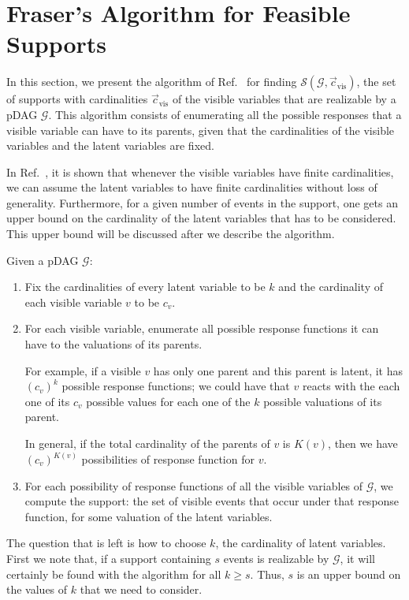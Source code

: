 \section{Fraser's Algorithm for Feasible Supports}
\label{appendix_supports}

In this section, we present the algorithm of Ref.~\cite{Fraser_Combinatorial_Solution} for finding $\mathcal{S}(\mathcal{G},\vec c_\text{vis})$, the set of supports with cardinalities $\vec c_\text{vis}$ of the visible variables that are realizable by a pDAG $\mathcal{G}$. This algorithm consists of enumerating all the possible responses that a visible variable can have to its parents, given that the cardinalities of the visible variables and the latent variables are fixed.

In Ref.~\cite{Fraser_Combinatorial_Solution}, it is shown that whenever the visible variables have finite cardinalities, we can assume the latent variables to have finite cardinalities without loss of generality. Furthermore, for a given number of events in the support, one gets an upper bound on the cardinality of the latent variables that has to be considered. This upper bound will be discussed after we describe the algorithm.

Given a pDAG $\mathcal{G}$:

\begin{enumerate}
    \item Fix the cardinalities of every latent variable to be $k$ and the cardinality of each visible variable $v$ to be $c_v$.
    \item For each visible variable, enumerate all possible response functions it can have to the valuations of its parents.
    
    For example, if a visible $v$ has only one parent and this parent is latent, it has $(c_v)^k$ possible response functions; we could have that $v$ reacts with the each one of its $c_v$ possible values for each one of the $k$ possible valuations of its parent.
     
    In general, if the total cardinality of the parents of $v$ is $K(v)$, then we have $(c_v)^{K(v)}$ possibilities of response function for $v$.
    \item For each possibility of response functions of all the visible variables of $\mathcal{G}$, we compute the support: the set of visible events that occur under that response function, for some valuation of the latent variables.
\end{enumerate}
The question that is left is how to choose $k$, the cardinality of latent variables. First we note that, if a support containing $s$ events is realizable by $\mathcal{G}$, it will certainly be found with the algorithm for all $k\geq s$. Thus, $s$ is an upper bound on the values of $k$ that we need to consider.

